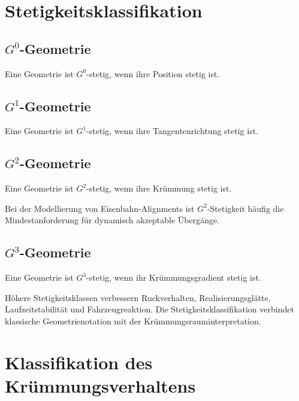 \section{Stetigkeitsklassifikation}

\subsection{\texorpdfstring{$G^0$}{G0}-Geometrie}
\begin{definition}
\label{def:g0-geometry}
Eine Geometrie ist \(G^0\)-stetig, wenn ihre Position stetig ist.
\end{definition}

\subsection{\texorpdfstring{$G^1$}{G1}-Geometrie}
\begin{definition}
\label{def:g1-geometry}
Eine Geometrie ist \(G^1\)-stetig, wenn ihre Tangentenrichtung stetig ist.
\end{definition}

\subsection{\texorpdfstring{$G^2$}{G2}-Geometrie}
\begin{definition}
\label{def:g2-geometry}
Eine Geometrie ist \(G^2\)-stetig, wenn ihre Krümmung stetig ist.
\end{definition}
Bei der Modellierung von Eisenbahn-Alignments ist \(G^2\)-Stetigkeit häufig
die Mindestanforderung für dynamisch akzeptable Übergänge.

\subsection{\texorpdfstring{$G^3$}{G3}-Geometrie}
\begin{definition}
\label{def:g3-geometry}
Eine Geometrie ist \(G^3\)-stetig, wenn ihr Krümmungsgradient stetig ist.
\end{definition}

Höhere Stetigkeitsklassen verbessern Ruckverhalten, Realisierungsglätte,
Laufzeitstabilität und Fahrzeugreaktion. Die Stetigkeitsklassifikation
verbindet klassische Geometrienotation mit der Krümmungsrauminterpretation.

\section{Klassifikation des Krümmungsverhaltens}

